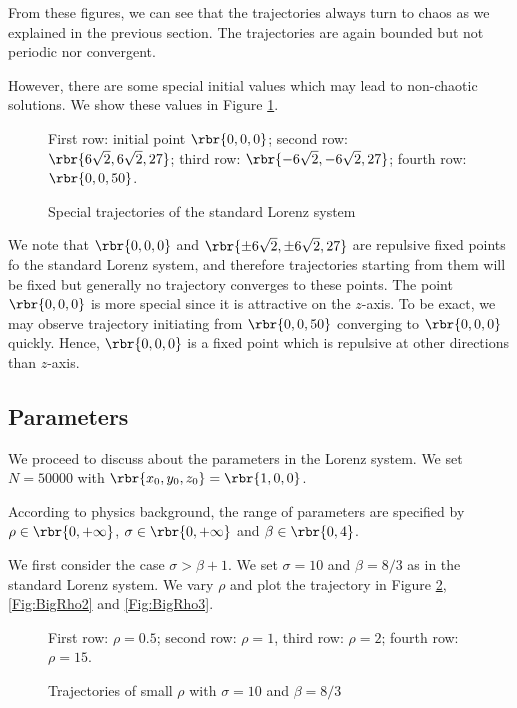 \documentclass[english, nochinese]{pnote}
\begin{document}
From these figures, we can see that the trajectories always turn to chaos as we explained in the previous section. The trajectories are again bounded but not periodic nor convergent.

However, there are some special initial values which may lead to non-chaotic solutions. We show these values in Figure \ref{Fig:InitSpec}.

\begin{figure}[htbp]
{
\centering
\scalebox{0.5}{}
\scalebox{0.5}{}
\scalebox{0.5}{}
\scalebox{0.5}{}
\caption{Special trajectories of the standard Lorenz system}
\label{Fig:InitSpec}
}
{
\footnotesize First row: initial point $ \rbr{ 0, 0, 0 } $; second row: $ \rbr{ 6 \sqrt{2}, 6 \sqrt{2}, 27 } $; third row: $ \rbr{ -6 \sqrt{2}, -6 \sqrt{2}, 27 } $; fourth row: $ \rbr{ 0, 0, 50 } $.
}
\end{figure}

We note that $ \rbr{ 0, 0, 0 } $ and $ \rbr{ \pm 6 \sqrt{2}, \pm 6 \sqrt{2}, 27 } $ are repulsive fixed points fo the standard Lorenz system, and therefore trajectories starting from them will be fixed but generally no trajectory converges to these points. The point $ \rbr{ 0, 0, 0 } $ is more special since it is attractive on the $z$-axis. To be exact, we may observe trajectory initiating from $ \rbr{ 0, 0, 50 } $ converging to $ \rbr{ 0, 0, 0 } $ quickly. Hence, $ \rbr{ 0, 0, 0 } $ is a fixed point which is repulsive at other directions than $z$-axis.

\subsection{Parameters}

We proceed to discuss about the parameters in the Lorenz system. We set $ N = 50000 $ with $ \rbr{ x_0, y_0, z_0 } = \rbr{ 1, 0, 0 } $.

According to physics background, the range of parameters are specified by $ \rho \in \rbr{ 0, +\infty } $, $ \sigma \in \rbr{ 0, +\infty } $ and $ \beta \in \rbr{ 0, 4 } $.

We first consider the case $ \sigma > \beta + 1 $. We set $ \sigma = 10 $ and $ \beta = 8 / 3 $ as in the standard Lorenz system. We vary $\rho$ and plot the trajectory in Figure \ref{Fig:BigRho1}, \ref{Fig:BigRho2} and \ref{Fig:BigRho3}.

\begin{figure}[htbp]
{
\centering
\scalebox{0.5}{}
\scalebox{0.5}{}
\scalebox{0.5}{}
\scalebox{0.5}{}
\caption{Trajectories of small $\rho$ with $ \sigma = 10 $ and $ \beta = 8 / 3 $}
\label{Fig:BigRho1}
}
{
\footnotesize First row: $ \rho = 0.5 $; second row: $ \rho = 1 $, third row: $ \rho = 2 $; fourth row: $ \rho = 15 $.
}
\end{figure}
\end{document}
